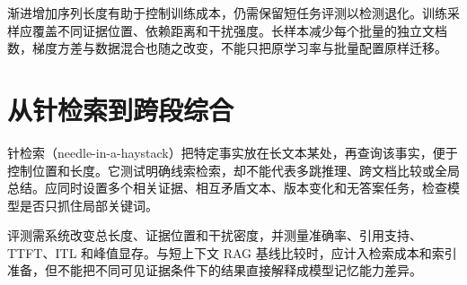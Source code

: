 渐进增加序列长度有助于控制训练成本，仍需保留短任务评测以检测退化。训练采样应覆盖不同证据位置、依赖距离和干扰强度。长样本减少每个批量的独立文档数，梯度方差与数据混合也随之改变，不能只把原学习率与批量配置原样迁移。

\section{从针检索到跨段综合}

针检索（needle-in-a-haystack）把特定事实放在长文本某处，再查询该事实，便于控制位置和长度。它测试明确线索检索，却不能代表多跳推理、跨文档比较或全局总结。应同时设置多个相关证据、相互矛盾文本、版本变化和无答案任务，检查模型是否只抓住局部关键词。

评测需系统改变总长度、证据位置和干扰密度，并测量准确率、引用支持、TTFT、ITL 和峰值显存。与短上下文 RAG 基线比较时，应计入检索成本和索引准备，但不能把不同可见证据条件下的结果直接解释成模型记忆能力差异。

